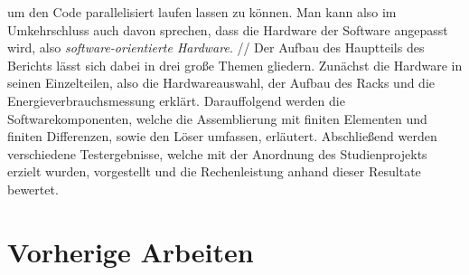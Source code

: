  um den Code parallelisiert laufen lassen zu können. Man kann also im Umkehrschluss auch davon sprechen,
 dass die Hardware der Software angepasst wird, also \textit{software-orientierte Hardware}. 
//
Der Aufbau des Hauptteils des Berichts lässt sich dabei in drei große Themen gliedern.
 Zunächst die Hardware in seinen Einzelteilen, also die Hardwareauswahl,
 der Aufbau des Racks und die Energieverbrauchsmessung erklärt.
 Darauffolgend werden die Softwarekomponenten, welche die Assemblierung mit finiten Elementen und finiten Differenzen,
 sowie den Löser umfassen, erläutert. Abschließend werden verschiedene Testergebnisse,
 welche mit der Anordnung des Studienprojekts erzielt wurden, vorgestellt und die Rechenleistung anhand dieser Resultate bewertet. 



\section{Vorherige Arbeiten }


